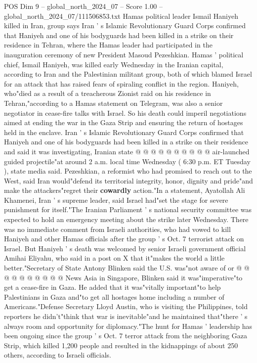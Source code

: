 \begin{textsample}{POS Dim 9 – global\_north\_2024\_07 – Score 1.00 – global\_north\_2024\_07/111506853.txt}  \label{ex:f9_pos_320}
Hamas political leader Ismail Haniyeh killed in Iran, group says Iran ' s Islamic Revolutionary Guard Corps confirmed that Haniyeh and one of his bodyguards had been killed in a strike on their residence in Tehran, where the Hamas leader had participated in the inauguration ceremony of new President Masoud Pezeshkian.
Hamas ' political chief, Ismail Haniyeh, was killed early Wednesday in the Iranian capital, according to Iran and the Palestinian militant group, both of which blamed Israel for an attack that has raised fears of spiraling conflict in the region.
Haniyeh, who"died as a result of a treacherous Zionist raid on his residence in Tehran,"according to a Hamas statement on Telegram, was also a senior negotiator in cease-fire talks with Israel.
So his death could imperil negotiations aimed at ending the war in the Gaza Strip and ensuring the return of hostages held in the enclave.
Iran ' s Islamic Revolutionary Guard Corps confirmed that Haniyeh and one of his bodyguards had been killed in a strike on their residence and said it was investigating, Iranian state @ @ @ @ @ @ @ @ @ @ air-launched guided projectile"at around 2 a.m. local time Wednesday ( 6:30 p.m.
ET Tuesday ), state media said.
Pezeshkian, a reformist who had promised to reach out to the West, said Iran would"defend its territorial integrity, honor, dignity and pride"and make the attackers"regret their \textbf{cowardly} action."In a statement, Ayatollah Ali Khamenei, Iran ' s supreme leader, said Israel had"set the stage for severe punishment for itself."The Iranian Parliament ' s national security committee was expected to hold an emergency meeting about the strike later Wednesday.
There was no immediate comment from Israeli authorities, who had vowed to kill Haniyeh and other Hamas officials after the group ' s Oct. 7 terrorist attack on Israel.
But Haniyeh ' s death was welcomed by senior Israeli government official Amihai Eliyahu, who said in a post on X that it"makes the world a little better."Secretary of State Antony Blinken said the U.S. was"not aware of or @ @ @ @ @ @ @ @ @ @ News Asia in Singapore, Blinken said it was"imperative"to get a cease-fire in Gaza.
He added that it was"vitally important"to help Palestinians in Gaza and"to get all hostages home including a number of Americans."Defense Secretary Lloyd Austin, who is visiting the Philippines, told reporters he didn't"think that war is inevitable"and he maintained that"there ' s always room and opportunity for diplomacy."The hunt for Hamas ' leadership has been ongoing since the group ' s Oct. 7 terror attack from the neighboring Gaza Strip, which killed 1,200 people and resulted in the kidnappings of about 250 others, according to Israeli officials.

\end{textsample}

